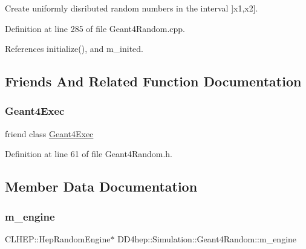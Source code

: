Create uniformly disributed random numbers in the interval \mbox{]}x1,x2\mbox{]}. 



Definition at line 285 of file Geant4\+Random.\+cpp.



References initialize(), and m\+\_\+inited.



\subsection{Friends And Related Function Documentation}
\hypertarget{class_d_d4hep_1_1_simulation_1_1_geant4_random_ac0f82c2b468e2eec2341f3740273273a}{}\label{class_d_d4hep_1_1_simulation_1_1_geant4_random_ac0f82c2b468e2eec2341f3740273273a} 
\subsubsection{\texorpdfstring{Geant4\+Exec}{Geant4Exec}}
{\footnotesize\ttfamily friend class \hyperlink{class_d_d4hep_1_1_simulation_1_1_geant4_exec}{Geant4\+Exec}\hspace{0.3cm}{\ttfamily [friend]}}



Definition at line 61 of file Geant4\+Random.\+h.



\subsection{Member Data Documentation}
\hypertarget{class_d_d4hep_1_1_simulation_1_1_geant4_random_aad17696c3d6d9f9953a40e75d8125da6}{}\label{class_d_d4hep_1_1_simulation_1_1_geant4_random_aad17696c3d6d9f9953a40e75d8125da6} 
\subsubsection{\texorpdfstring{m\+\_\+engine}{m\_engine}}
{\footnotesize\ttfamily C\+L\+H\+E\+P\+::\+Hep\+Random\+Engine$\ast$ D\+D4hep\+::\+Simulation\+::\+Geant4\+Random\+::m\+\_\+engine\hspace{0.3cm}{\ttfamily [protected]}}



